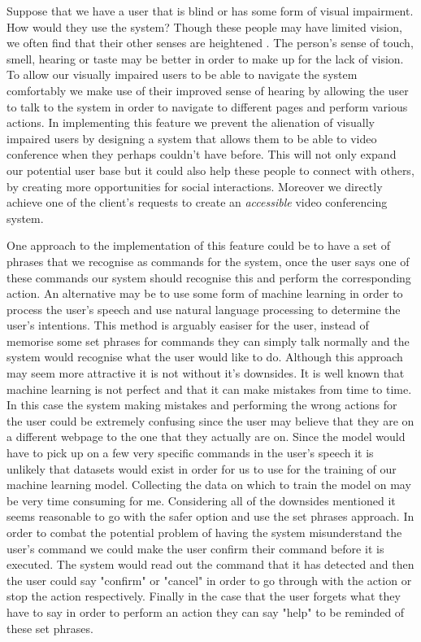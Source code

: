 Suppose that we have a user that is blind or has some form 
of visual impairment. How would they use the system? Though 
these people may have limited vision, we often find that 
their other senses are heightened \cite{blind}. The person's
sense of touch, smell, hearing or taste may be better in order
to make up for the lack of vision. To allow our visually 
impaired users to be able to navigate the system comfortably 
we make use of their improved sense of hearing by allowing the
user to talk to the system in order to navigate to different 
pages and perform various actions. In implementing this 
feature we prevent the alienation of visually impaired users
by designing a system that allows them to be able to video
conference when they perhaps couldn't have before. This will 
not only expand our potential user base but it could also 
help these people to connect with others, by creating more 
opportunities for social interactions. Moreover 
we directly achieve one of the client's requests to create 
an \textit{accessible} video conferencing system. \\
\vspace{0.2cm}

One approach to the implementation of this feature could
be to have a set of phrases that we recognise as commands 
for the system, once 
the user says one of these commands our system should
recognise this and perform the corresponding action. An 
alternative may be to use some form of machine learning in 
order to process the user's speech and use natural language
processing to determine the user's intentions. This method is
arguably easiser for the user, instead of memorise some set
phrases for commands they can simply talk normally and the
system would recognise what the user would like to do. 
Although this approach may seem more attractive it is not 
without it's downsides. It is well known that machine 
learning is not perfect and that it can make mistakes from 
time to time. In this case the system making mistakes and
performing the wrong actions for the user could be extremely
confusing since the user may believe that they are on a
different webpage to the one that they actually are on. Since 
the model would have to pick up on a few very specific
commands in the user's speech it is unlikely that datasets 
would exist in order for us to use for the training of our 
machine learning model. Collecting the data on 
which to train the model on may be very time consuming for me.
Considering all of the downsides mentioned it seems 
reasonable to go with the safer option and use the set
phrases approach. In order to combat the potential problem of
having the system misunderstand the user's command we could 
make the user confirm their command before it is executed.
The system would read out the command that it has detected and
then the user could say "confirm" or "cancel" in order to 
go through with the action or stop the action respectively. 
Finally in the case that the user forgets what they have to 
say in order to perform an action they can say "help" to be 
reminded of these set phrases.
\\ \vspace{0.2cm}


